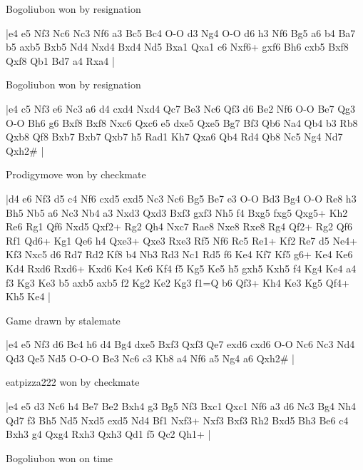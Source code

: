 \showboard

Bogoliubon won by resignation

\makegametitle
|e4 e5 Nf3 Nc6 Nc3 Nf6 a3 Bc5 Bc4 O-O d3 Ng4 O-O d6 h3 Nf6 Bg5 a6 b4 Ba7 b5 axb5 Bxb5 Nd4 Nxd4 Bxd4 Nd5 Bxa1 Qxa1 c6 Nxf6+ gxf6 Bh6 cxb5 Bxf8 Qxf8 Qb1 Bd7 a4 Rxa4  |

\showboard

Bogoliubon won by resignation

\makegametitle
|e4 c5 Nf3 e6 Nc3 a6 d4 cxd4 Nxd4 Qc7 Be3 Nc6 Qf3 d6 Be2 Nf6 O-O Be7 Qg3 O-O Bh6 g6 Bxf8 Bxf8 Nxc6 Qxc6 e5 dxe5 Qxe5 Bg7 Bf3 Qb6 Na4 Qb4 b3 Rb8 Qxb8 Qf8 Bxb7 Bxb7 Qxb7 h5 Rad1 Kh7 Qxa6 Qb4 Rd4 Qb8 Nc5 Ng4 Nd7 Qxh2\#  |

\showboard

Prodigymove won by checkmate

\makegametitle
|d4 e6 Nf3 d5 c4 Nf6 cxd5 exd5 Nc3 Nc6 Bg5 Be7 e3 O-O Bd3 Bg4 O-O Re8 h3 Bh5 Nb5 a6 Nc3 Nb4 a3 Nxd3 Qxd3 Bxf3 gxf3 Nh5 f4 Bxg5 fxg5 Qxg5+ Kh2 Re6 Rg1 Qf6 Nxd5 Qxf2+ Rg2 Qh4 Nxc7 Rae8 Nxe8 Rxe8 Rg4 Qf2+ Rg2 Qf6 Rf1 Qd6+ Kg1 Qe6 h4 Qxe3+ Qxe3 Rxe3 Rf5 Nf6 Rc5 Re1+ Kf2 Re7 d5 Ne4+ Kf3 Nxc5 d6 Rd7 Rd2 Kf8 b4 Nb3 Rd3 Nc1 Rd5 f6 Ke4 Kf7 Kf5 g6+ Ke4 Ke6 Kd4 Rxd6 Rxd6+ Kxd6 Ke4 Ke6 Kf4 f5 Kg5 Ke5 h5 gxh5 Kxh5 f4 Kg4 Ke4 a4 f3 Kg3 Ke3 b5 axb5 axb5 f2 Kg2 Ke2 Kg3 f1=Q b6 Qf3+ Kh4 Ke3 Kg5 Qf4+ Kh5 Ke4  |

\showboard

Game drawn by stalemate

\makegametitle
|e4 e5 Nf3 d6 Bc4 h6 d4 Bg4 dxe5 Bxf3 Qxf3 Qe7 exd6 cxd6 O-O Nc6 Nc3 Nd4 Qd3 Qe5 Nd5 O-O-O Be3 Nc6 c3 Kb8 a4 Nf6 a5 Ng4 a6 Qxh2\#  |

\showboard

eatpizza222 won by checkmate

\makegametitle
|e4 e5 d3 Nc6 h4 Be7 Be2 Bxh4 g3 Bg5 Nf3 Bxc1 Qxc1 Nf6 a3 d6 Nc3 Bg4 Nh4 Qd7 f3 Bh5 Nd5 Nxd5 exd5 Nd4 Bf1 Nxf3+ Nxf3 Bxf3 Rh2 Bxd5 Bh3 Be6 c4 Bxh3 g4 Qxg4 Rxh3 Qxh3 Qd1 f5 Qc2 Qh1+  |

\showboard

Bogoliubon won on time


